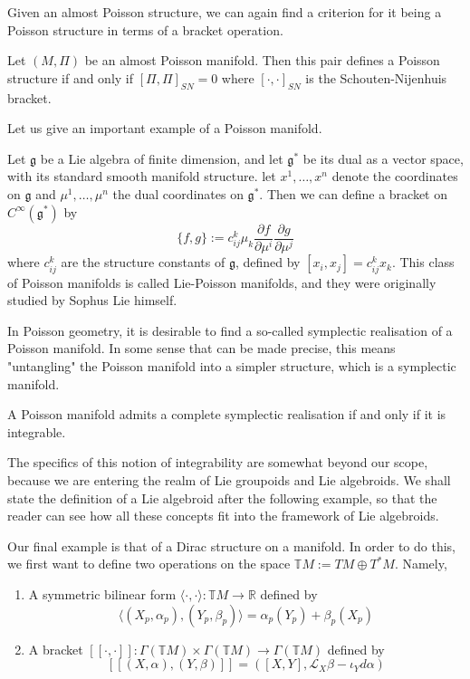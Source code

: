 Given an almost Poisson structure, we can again find a criterion for it being a Poisson structure in terms of a bracket operation.
\begin{theorem}
  Let $(M,\Pi)$ be an almost Poisson manifold. Then this pair defines a Poisson structure if and only if $[\Pi,\Pi]_{SN}=0$ where $[\cdot,\cdot]_{SN}$ is the Schouten-Nijenhuis bracket.
\end{theorem}
Let us give an important example of a Poisson manifold.
\begin{example}
  Let $\mathfrak{g}$ be a Lie algebra of finite dimension, and let $\mathfrak{g}^*$ be its dual as a vector space, with its standard smooth manifold structure. let $x^1,\dots,x^n$ denote the coordinates on $\mathfrak{g}$ and $\mu^1,\dots,\mu^n$ the dual coordinates on $\mathfrak{g}^*$. Then we can define a bracket on $C^\infty(\mathfrak{g}^*)$ by
  $$\{f,g\}:= c_{ij}^k\mu_k\frac{\partial f}{\partial\mu^i}\frac{\partial g}{\partial\mu^j}$$
  where $c_{ij}^k$ are the structure constants of $\mathfrak{g}$, defined by $[x_i,x_j]=c_{ij}^kx_k$. This class of Poisson manifolds is called Lie-Poisson manifolds, and they were originally studied by Sophus Lie himself.
\end{example}
In Poisson geometry, it is desirable to find a so-called symplectic realisation of a Poisson manifold. In some sense that can be made precise, this means "untangling" the Poisson manifold into a simpler structure, which is a symplectic manifold.
\begin{theorem}
  A Poisson manifold admits a complete symplectic realisation if and only if it is integrable.
\end{theorem}
The specifics of this notion of integrability are somewhat beyond our scope, because we are entering the realm of Lie groupoids and Lie algebroids. We shall state the definition of a Lie algebroid after the following example, so that the reader can see how all these concepts fit into the framework of Lie algebroids.\par
Our final example is that of a Dirac structure on a manifold. In order to do this, we first want to define two operations on the space $\mathbb{T}M:=TM\oplus T^*M$. Namely,
\begin{enumerate}
  \item A symmetric bilinear form $\langle\cdot,\cdot\rangle:\mathbb{T}M\to\mathbb{R}$ defined by $$\langle(X_p,\alpha_p),(Y_p,\beta_p)\rangle=\alpha_p(Y_p)+\beta_p(X_p)$$
  \item A bracket  $[\![\cdot,\cdot]\!]:\Gamma(\mathbb{T}M)\times\Gamma(\mathbb{T}M)\to\Gamma(\mathbb{T}M)$ defined by $$[\![(X,\alpha),(Y,\beta)]\!]=([X,Y],\mathcal{L}_X\beta-\iota_Yd\alpha)$$
\end{enumerate}
